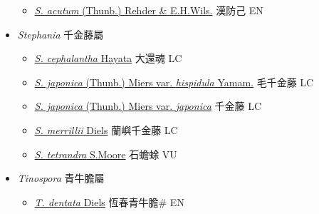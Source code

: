 \begin{itemize}
  \begin{itemize}
        \item[] \href{http://www.theplantlist.org/tpl1.1/search?q=Sinomenium+acutum}{\textit{S. acutum} (Thunb.) Rehder \& E.H.Wils.}   漢防己 EN
  \end{itemize}
 \item[] \textit{Stephania} 千金藤屬
                    
  \begin{itemize}
        \item[] \href{http://www.theplantlist.org/tpl1.1/search?q=Stephania+cephalantha}{\textit{S. cephalantha} Hayata}   大還魂 LC
        \item[] \href{http://www.theplantlist.org/tpl1.1/search?q=Stephania+japonica+var.+hispidula}{\textit{S. japonica} (Thunb.) Miers var. \textit{hispidula} Yamam.}   毛千金藤 LC
        \item[] \href{http://www.theplantlist.org/tpl1.1/search?q=Stephania+japonica+var.+japonica}{\textit{S. japonica} (Thunb.) Miers var. \textit{japonica}}   千金藤 LC
        \item[] \href{http://www.theplantlist.org/tpl1.1/search?q=Stephania+merrillii}{\textit{S. merrillii} Diels}   蘭嶼千金藤 LC
        \item[] \href{http://www.theplantlist.org/tpl1.1/search?q=Stephania+tetrandra}{\textit{S. tetrandra} S.Moore}   石蟾蜍 VU
  \end{itemize}
 \item[] \textit{Tinospora} 青牛膽屬
                    
  \begin{itemize}
        \item[] \href{http://www.theplantlist.org/tpl1.1/search?q=Tinospora+dentata}{\textit{T. dentata} Diels}   恆春青牛膽\# EN
  \end{itemize}
  \end{itemize}
